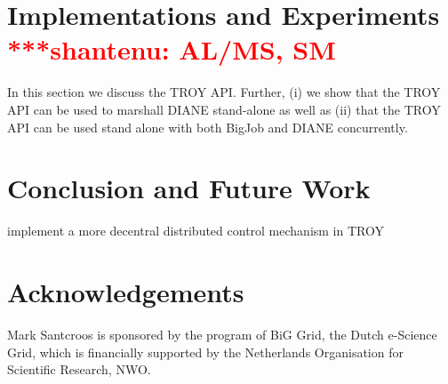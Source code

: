 \documentclass[conference,final]{IEEEtran}
\newcommand{\jhanote}[1]{ {\textcolor{red} { ***shantenu: #1 }}}
\newcommand{\jhanote}[1]{}
\begin{document}
\section{Implementations and Experiments \jhanote{AL/MS, SM}}

In this section we discuss the TROY API. Further, (i) we show that the TROY API 
can be used to  marshall DIANE stand-alone as well as (ii) that the TROY API 
can be used stand alone with both BigJob and DIANE concurrently.

\section{Conclusion and Future Work}


implement a more decentral distributed control mechanism in TROY

\section*{Acknowledgements}
Mark Santcroos is sponsored by the program of BiG Grid, the Dutch e-Science Grid, which is financially supported by the Netherlands Organisation for Scientific Research, NWO.




\end{document}
